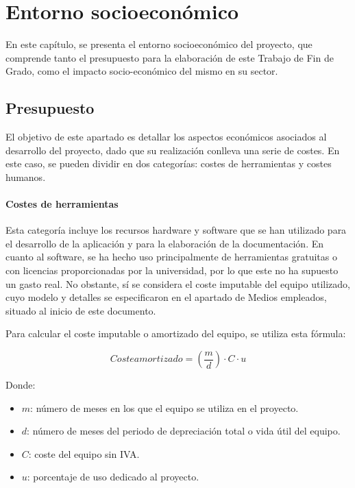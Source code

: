 \chapter{Entorno socioeconómico}

En este capítulo, se presenta el entorno socioeconómico del proyecto, que comprende tanto el presupuesto para la elaboración de este Trabajo de Fin de Grado, como el impacto socio-económico del mismo en su sector.

\section{Presupuesto}

El objetivo de este apartado es detallar los aspectos económicos asociados al desarrollo del proyecto, dado que su realización conlleva una serie de costes. En este caso, se pueden dividir en dos categorías: costes de herramientas y costes humanos.

\subsubsection{Costes de herramientas}

Esta categoría incluye los recursos hardware y software que se han utilizado para el desarrollo de la aplicación y para la elaboración de la documentación. En cuanto al software, se ha hecho uso principalmente de herramientas gratuitas o con licencias proporcionadas por la universidad, por lo que este no ha supuesto un gasto real. No obstante, sí se considera el coste imputable del equipo utilizado, cuyo modelo y detalles se especificaron en el apartado de Medios empleados, situado al inicio de este documento.

Para calcular el coste imputable o amortizado del equipo, se utiliza esta fórmula:

\[
Coste amortizado = \left(\frac{m}{d}\right) \cdot C \cdot u
\]

Donde:
\begin{itemize}
	\item $m$: número de meses en los que el equipo se utiliza en el proyecto.
	\item $d$: número de meses del periodo de depreciación total o vida útil del equipo.
	\item $C$: coste del equipo sin IVA.
	\item $u$: porcentaje de uso dedicado al proyecto.
\end{itemize}

